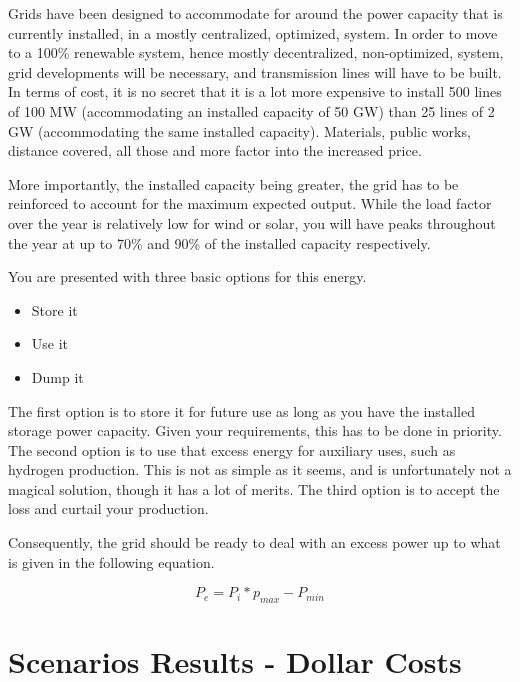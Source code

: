 Grids have been designed to accommodate for around the power capacity that is currently installed, in a mostly centralized, optimized, system. In order to move to a 100\% renewable system, hence mostly decentralized, non-optimized, system, grid developments will be necessary, and transmission lines will have to be built. In terms of cost, it is no secret that it is a lot more expensive to install 500 lines of 100 MW (accommodating an installed capacity of 50 GW) than 25 lines of 2 GW (accommodating the same installed capacity). Materials, public works, distance covered, all those and more factor into the increased price.

More importantly, the installed capacity being greater, the grid has to be reinforced to account for the maximum expected output. While the load factor over the year is relatively low for wind or solar, you will have peaks throughout the year at up to 70\% and 90\% of the installed capacity respectively. 

You are presented with three basic options for this energy.
\begin{itemize}
\item Store it
\item Use it
\item Dump it
\end{itemize}

The first option is to store it for future use as long as you have the installed storage power capacity. Given your requirements, this has to be done in priority. The second option is to use that excess energy for auxiliary uses, such as hydrogen production. This is not as simple as it seems, and is unfortunately not a magical solution, though it has a lot of merits. The third option is to accept the loss and curtail your production.


\begin{remark}
Consequently, the grid should be ready to deal with an excess power up to what is given in the following equation.

\begin{equation}\label{excess_power}
P_e = P_i * p_{max} - P_{min}
\end{equation}
\end{remark}

\section{Scenarios Results - Dollar Costs}

